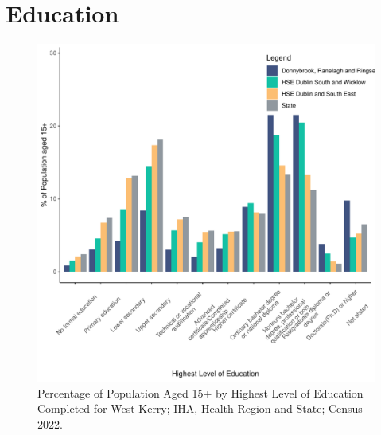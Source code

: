 \documentclass{article}
\begin{document}
\section{Education}\label{sect:Edu}
\begin{figure}[H]
	\centering
	\includegraphics[width = 120mm]{../figures/EduED.pdf}
	\caption{Percentage of Population Aged 15+ by Highest Level of Education Completed for West Kerry; IHA, Health Region and State; Census 2022.}
	\label{fig:vbnv}
	\end{figure}
\end{document}
